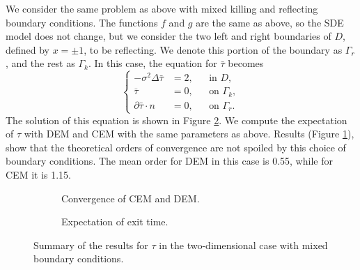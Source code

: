 We consider the same problem as above with mixed killing and reflecting boundary conditions. The functions $f$ and $g$ are the same as above, so the SDE model does not change, but we consider the two left and right boundaries of $D$, defined by $x = \pm 1$, to be reflecting. We denote this portion of the boundary as $\Gamma_r$, and the rest as $\Gamma_k$. In this case, the equation for $\bar\tau$ becomes
\begin{equation}\label{eq:PDETau2DKilling}
	\left \{
  	\begin{aligned}
	- \sigma^2 \Delta \bar \tau &= 2, && \text{in } D, \\
	\bar \tau &= 0, && \text{on } \Gamma_k, \\
	\partial \bar \tau \cdot n &= 0, && \text{on } \Gamma_r.
	\end{aligned} \right.
\end{equation}
The solution of this equation is shown in Figure \ref{fig:TauExact2DRefl}. We compute the expectation of $\tau$ with DEM and CEM with the same parameters as above. Results (Figure \ref{fig:ReflTwoD}), show that the theoretical orders of convergence are not spoiled by this choice of boundary conditions. The mean order for DEM in this case is 0.55, while for CEM it is 1.15.


\begin{figure}[t]
    \centering
    \begin{subfigure}{0.49\linewidth}
        \centering
        \resizebox{1\linewidth}{!}{ }  
        \caption{Convergence of CEM and DEM.}
        \label{fig:ReflTwoD}
    \end{subfigure}
    \begin{subfigure}{0.49\linewidth}
        \centering
        \resizebox{1\linewidth}{!}{ }  
        \caption{Expectation of exit time.}
        \label{fig:TauExact2DRefl}
    \end{subfigure}    
    \caption{Summary of the results for $\tau$ in the two-dimensional case with mixed boundary conditions.}
    \label{fig:OrdersTwoDRefl}
\end{figure}
